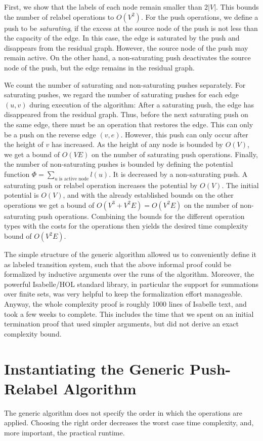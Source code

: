 \documentclass[smallcondensed]{svjour3}     %
\begin{document}
First, we show that the labels of each node remain smaller than $2|V|$. This bounds the number of relabel operations to $O(V^2)$.
For the push operations, we define a push to be \emph{saturating}, if the excess at the source node of the push is not less than the capacity of the edge.
In this case, the edge is saturated by the push and disappears from the residual graph. However, the source node of the push may remain active.
On the other hand, a non-saturating push deactivates the source node of the push, but the edge remains in the residual graph.

We count the number of saturating and non-saturating pushes separately. For saturating pushes, we regard the number of saturating pushes for each edge $(u,v)$ during execution of the algorithm: After a saturating push, the edge has disappeared from the residual graph. Thus, before the next saturating push on the same edge, 
there must be an operation that restores the edge. This can only be a push on the reverse edge $(v,e)$. 
However, this push can only occur after the height of $v$ has increased. As the height of any node is bounded by $O(V)$, we get a bound of $O(VE)$ on the number 
of saturating push operations. 
Finally, the number of non-saturating pushes is bounded by defining the potential function $\Phi = \sum_{\textrm{$u$ is active node}}l(u)$.
It is decreased by a non-saturating push.
A saturating push or relabel operation increases the potential by $O(V)$.
The initial potential is $O(V)$, and with the already established bounds on the other operations we get a bound of
$O(V^3 + V^2E) = O(V^2E)$ on the number of non-saturating push operations. Combining the bounds for the different operation types with the costs for the operations 
then yields the desired time complexity bound of $O(V^2E)$.

The simple structure of the generic algorithm allowed us to conveniently define it as labeled transition system, such that the above informal proof could be formalized
by inductive arguments over the runs of the algorithm.
Moreover, the powerful Isabelle/HOL standard library, in particular the support for summations
over finite sets, was very helpful to keep the formalization effort manageable. 
Anyway, the whole complexity proof is roughly 1000 lines of Isabelle text, and took a few weeks to complete.
This includes the time that we spent on an initial termination proof that used simpler arguments, but did not derive an exact complexity bound.

\section{Instantiating the Generic Push-Relabel Algorithm}\label{sec:prpu-inst}
The generic algorithm does not specify the order in which the operations are applied. 
Choosing the right order decreases the worst case time complexity, and, more important, the practical runtime.
\end{document}
